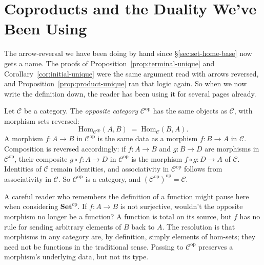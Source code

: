 \section{Coproducts and the Duality We've Been Using}\label{sec:coproducts}

\noindent The arrow-reversal we have been doing by hand since
\S\ref{sec:set-home-base} now gets a name. The proofs of
Proposition~\ref{prop:terminal-unique} and
Corollary~\ref{cor:initial-unique} were the same argument read
with arrows reversed, and Proposition~\ref{prop:product-unique}
ran that logic again. So when we now write the definition down,
the reader has been using it for several pages already.

\begin{definition}\label{def:opposite-category}
Let $\mathcal{C}$ be a category. The
\textit{opposite category}
$\mathcal{C}^{\mathrm{op}}$ has the same objects as
$\mathcal{C}$, with morphism sets reversed:
\[ \mathrm{Hom}_{\mathcal{C}^{\mathrm{op}}}(A, B) \; = \;
   \mathrm{Hom}_{\mathcal{C}}(B, A). \]
A morphism $f : A \to B$ in $\mathcal{C}^{\mathrm{op}}$ is the
same data as a morphism $f : B \to A$ in $\mathcal{C}$.
Composition is reversed accordingly: if $f : A \to B$ and
$g : B \to D$ are morphisms in $\mathcal{C}^{\mathrm{op}}$, their
composite $g \circ f : A \to D$ in $\mathcal{C}^{\mathrm{op}}$ is
the morphism $f \circ g : D \to A$ of $\mathcal{C}$. Identities of
$\mathcal{C}$ remain identities, and associativity in
$\mathcal{C}^{\mathrm{op}}$ follows from associativity in
$\mathcal{C}$. So $\mathcal{C}^{\mathrm{op}}$ is a category, and
$(\mathcal{C}^{\mathrm{op}})^{\mathrm{op}} = \mathcal{C}$.
\end{definition}

\noindent A careful reader who remembers the definition of a
function might pause here when considering
$\mathbf{Set}^{\mathrm{op}}$. If $f : A \to B$ is not surjective,
wouldn't the opposite morphism no longer be a function? A
function is total on its source, but $f$ has no rule for sending
arbitrary elements of $B$ back to $A$. The resolution is that
morphisms in any category are, by definition, simply elements of
hom-sets; they need not be functions in the traditional sense.
Passing to $\mathcal{C}^{\mathrm{op}}$ preserves a morphism's
underlying data, but not its type.\\

